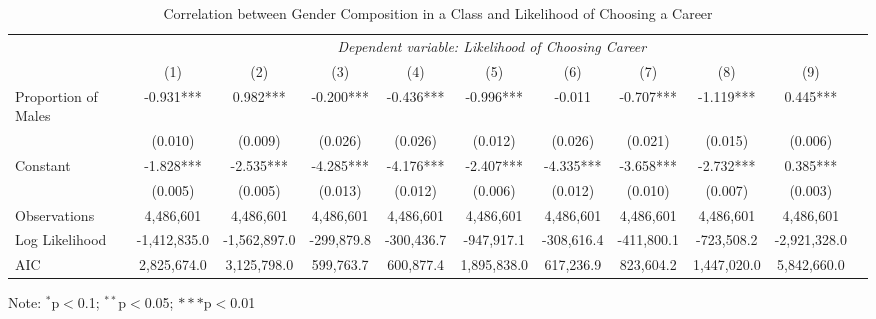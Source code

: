 \begin{table}[!htbp]
  \centering
  \caption{Correlation between Gender Composition in a Class and Likelihood of Choosing a Career}
  \label{tab:tab1}
  \begin{tabular}{lcccccccccc}
    \toprule
    & \multicolumn{9}{c}{\textit{Dependent variable: Likelihood of Choosing Career}} \\
    \cmidrule(lr){2-10} 
    & (1) & (2) & (3) & (4) & (5) & (6) & (7) & (8) & (9) \\
    \midrule
    Proportion of Males & -0.931*** & 0.982*** & -0.200*** & -0.436*** & -0.996*** & -0.011 & -0.707*** & -1.119*** & 0.445*** \\
    & (0.010) & (0.009) & (0.026) & (0.026) & (0.012) & (0.026) & (0.021) & (0.015) & (0.006) \\
    \addlinespace
    Constant & -1.828*** & -2.535*** & -4.285*** & -4.176*** & -2.407*** & -4.335*** & -3.658*** & -2.732*** & 0.385*** \\
    & (0.005) & (0.005) & (0.013) & (0.012) & (0.006) & (0.012) & (0.010) & (0.007) & (0.003) \\
    \midrule
    Observations & \multicolumn{1}{c}{4,486,601} & \multicolumn{1}{c}{4,486,601} & \multicolumn{1}{c}{4,486,601} & \multicolumn{1}{c}{4,486,601} & \multicolumn{1}{c}{4,486,601} & \multicolumn{1}{c}{4,486,601} & \multicolumn{1}{c}{4,486,601} & \multicolumn{1}{c}{4,486,601} & \multicolumn{1}{c}{4,486,601} \\
    Log Likelihood & \multicolumn{1}{c}{-1,412,835.0} & \multicolumn{1}{c}{-1,562,897.0} & \multicolumn{1}{c}{-299,879.8} & \multicolumn{1}{c}{-300,436.7} & \multicolumn{1}{c}{-947,917.1} & \multicolumn{1}{c}{-308,616.4} & \multicolumn{1}{c}{-411,800.1} & \multicolumn{1}{c}{-723,508.2} & \multicolumn{1}{c}{-2,921,328.0} \\
    AIC & \multicolumn{1}{c}{2,825,674.0} & \multicolumn{1}{c}{3,125,798.0} & \multicolumn{1}{c}{599,763.7} & \multicolumn{1}{c}{600,877.4} & \multicolumn{1}{c}{1,895,838.0} & \multicolumn{1}{c}{617,236.9} & \multicolumn{1}{c}{823,604.2} & \multicolumn{1}{c}{1,447,020.0} & \multicolumn{1}{c}{5,842,660.0} \\
    \bottomrule
  \end{tabular}
\begin{threeparttable}
  \begin{tablenotes}
  \small
    \item Note: $^{*}$p$<$0.1; $^{**}$p$<$0.05; $***$p$<$0.01 
  \end{tablenotes}
  \end{threeparttable}
\end{table}